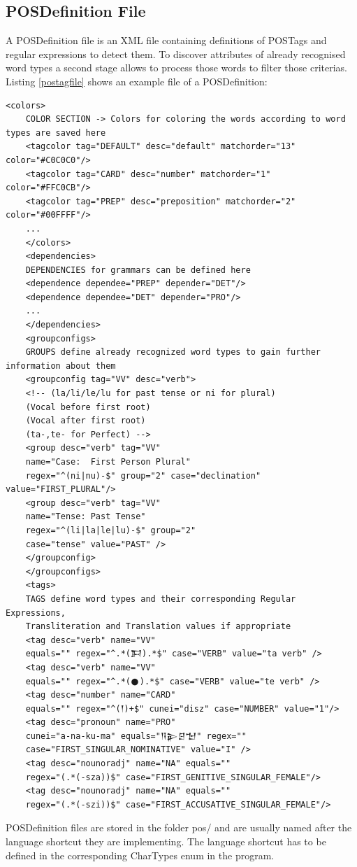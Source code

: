 \documentclass[10pt,a4paper,titlepage]{report}
\begin{document}
	\subsection{POSDefinition File}
	A POSDefinition file is an XML file containing definitions of POSTags and regular expressions to detect them. To discover attributes of already recognised word types a second stage allows to process those words to filter those criterias. 
	Listing \ref{postagfile} shows an example file of a POSDefinition:
	\begin{lstlisting}[caption=POSDefinition File\label{postagfile}]
	<colors>
	COLOR SECTION -> Colors for coloring the words according to word types are saved here
	<tagcolor tag="DEFAULT" desc="default" matchorder="13" color="#C0C0C0"/>
	<tagcolor tag="CARD" desc="number" matchorder="1" color="#FFC0CB"/>
	<tagcolor tag="PREP" desc="preposition" matchorder="2" color="#00FFFF"/>
	...
	</colors>
	<dependencies>
	DEPENDENCIES for grammars can be defined here
	<dependence dependee="PREP" depender="DET"/>
	<dependence dependee="DET" depender="PRO"/>
	...
	</dependencies>
	<groupconfigs>
	GROUPS define already recognized word types to gain further information about them
	<groupconfig tag="VV" desc="verb">
	<!-- (la/li/le/lu for past tense or ni for plural)
	(Vocal before first root)
	(Vocal after first root)
	(ta-,te- for Perfect) -->
	<group desc="verb" tag="VV" 
	name="Case:  First Person Plural" 
	regex="^(ni|nu)-$" group="2" case="declination" value="FIRST_PLURAL"/>
	<group desc="verb" tag="VV" 
	name="Tense: Past Tense" 
	regex="^(li|la|le|lu)-$" group="2" 
	case="tense" value="PAST" />
	</groupconfig>
	</groupconfigs>
	<tags>
	TAGS define word types and their corresponding Regular Expressions,
	Transliteration and Translation values if appropriate
	<tag desc="verb" name="VV"  
	equals="" regex="^.*(𒁕).*$" case="VERB" value="ta verb" />
	<tag desc="verb" name="VV"  
	equals="" regex="^.*(𒊹).*$" case="VERB" value="te verb" />	
	<tag desc="number" name="CARD" 
	equals="" regex="^(𒁹)+$" cunei="disz" case="NUMBER" value="1"/>
	<tag desc="pronoun" name="PRO" 
	cunei="a-na-ku-ma" equals="𒀀𒉌𒆪𒈠" regex="" 
	case="FIRST_SINGULAR_NOMINATIVE" value="I" />
	<tag desc="nounoradj" name="NA" equals=""
	regex="(.*(-sza))$" case="FIRST_GENITIVE_SINGULAR_FEMALE"/>
	<tag desc="nounoradj" name="NA" equals=""
	regex="(.*(-szi))$" case="FIRST_ACCUSATIVE_SINGULAR_FEMALE"/>
	\end{lstlisting}
	POSDefinition files are stored in the folder pos/ and are usually named after the language shortcut they are implementing. The language shortcut has to be defined in the corresponding CharTypes enum in the program.
\end{document}
